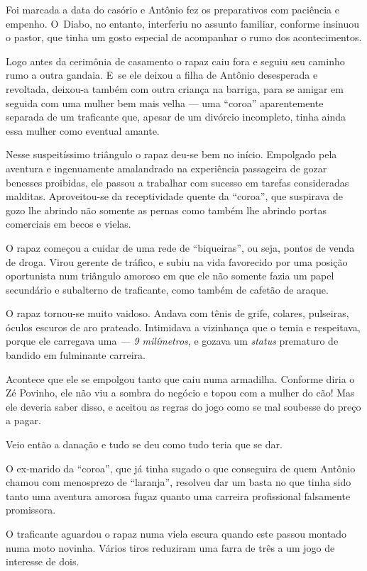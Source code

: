 Foi marcada a data do casório e Antônio fez os preparativos com
paciência e empenho. O~Diabo, no entanto, interferiu no assunto
familiar, conforme insinuou o pastor, que tinha um gosto especial de
acompanhar o rumo dos acontecimentos.

Logo antes da cerimônia de casamento o rapaz caiu fora e seguiu seu
caminho rumo a outra gandaia. E~se ele deixou a filha de Antônio desesperada e revoltada, deixou-a
também com outra criança na barriga, para se amigar em seguida com uma
mulher bem mais velha --- uma ``coroa'' aparentemente separada de um
traficante que, apesar de um divórcio incompleto, tinha ainda essa
mulher como eventual amante.

Nesse suspeitíssimo triângulo o rapaz deu-se bem no início. Empolgado
pela aventura e ingenuamente amalandrado na experiência passageira de
gozar benesses proibidas, ele passou a trabalhar com sucesso em tarefas
consideradas malditas. Aproveitou-se da receptividade quente da
``coroa'', que suspirava de gozo lhe abrindo não somente as pernas como
também lhe abrindo portas comerciais em becos e vielas.

O rapaz começou a cuidar de uma rede de ``biqueiras'', ou seja, pontos
de venda de droga. Virou gerente de tráfico, e subiu na vida favorecido
por uma posição oportunista num triângulo amoroso em que ele não somente
fazia um papel secundário e subalterno de traficante, como também de
cafetão de araque.

O rapaz tornou-se muito vaidoso. Andava com tênis de grife, colares,
pulseiras, óculos escuros de aro prateado. Intimidava a vizinhança que o
temia e respeitava, porque ele carregava uma \emph{ --- 9 milímetros},
e gozava um \emph{status} prematuro de bandido em fulminante carreira.

Acontece que ele se empolgou tanto que caiu numa armadilha. Conforme
diria o Zé Povinho, ele não viu a sombra do negócio e topou com a mulher
do cão! Mas ele deveria saber disso, e aceitou as regras do jogo como se
mal soubesse do preço a pagar.

Veio então a danação e tudo se deu como tudo teria que se dar.

O ex-marido da ``coroa'', que já tinha sugado o que conseguira de quem
Antônio chamou com menosprezo de ``laranja'', resolveu dar um basta no
que tinha sido tanto uma aventura amorosa fugaz quanto uma carreira
profissional falsamente promissora.

O traficante aguardou o rapaz numa viela escura quando este passou
montado numa moto novinha. Vários tiros reduziram uma farra de três a um
jogo de interesse de dois.

